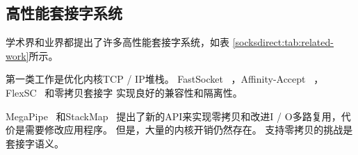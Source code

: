





\subsection{高性能套接字系统}
\label{socksdirect:subsec:related-work}

学术界和业界都提出了许多高性能套接字系统，如表 \ref {socksdirect:tab:related-work}所示。

第一类工作是优化内核TCP / IP堆栈。 FastSocket~ \cite {lin2016scalable}，Affinity-Accept~ \cite {pesterev2012improving}，FlexSC~ \cite {soares2010flexsc}和零拷贝套接字 \cite {thadani1995efficient,chu1996zero,linux-zero-copy}实现良好的兼容性和隔离性。

MegaPipe~ \cite {han2012megapipe}和StackMap~ \cite {yasukata2016stackmap}提出了新的API来实现零拷贝和改进I / O多路复用，代价是需要修改应用程序。
但是，大量的内核开销仍然存在。
支持零拷贝的挑战是套接字语义。

